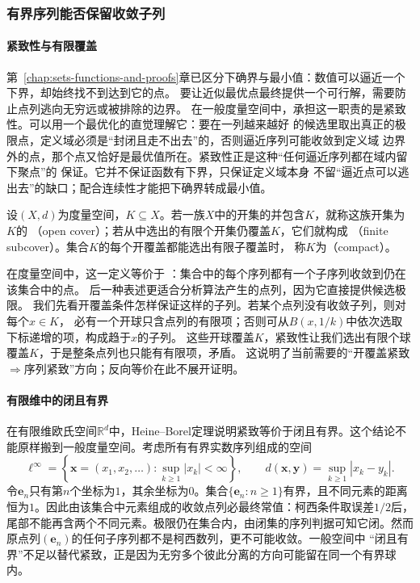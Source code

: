 \subsubsection{有界序列能否保留收敛子列}

\paragraph{紧致性与有限覆盖}

第~\ref{chap:sets-functions-and-proofs}章已区分下确界与最小值：数值可以逼近一个下界，却始终找不到达到它的点。
要让近似最优点最终提供一个可行解，需要防止点列逃向无穷远或被排除的边界。
在一般度量空间中，承担这一职责的是紧致性。可以用一个最优化的直觉理解它：要在一列越来越好
的候选里取出真正的极限点，定义域必须是“封闭且走不出去”的，否则逼近序列可能收敛到定义域
边界外的点，那个点又恰好是最优值所在。紧致性正是这种“任何逼近序列都在域内留下聚点”的
保证。它并不保证函数有下界，只保证定义域本身
不留“逼近点可以逃出去”的缺口；配合连续性才能把下确界转成最小值。
\begin{definition}[开覆盖与紧致性]
\label{def:analysis-compactness}
设$(X,d)$为度量空间，$K\subseteq X$。若一族$X$中的开集的并包含$K$，就称这族开集为$K$的
（open cover）；若从中选出的有限个开集仍覆盖$K$，它们就构成
（finite subcover）。集合$K$的每个开覆盖都能选出有限子覆盖时，
称$K$为（compact）。
\end{definition}
在度量空间中，这一定义等价于
：集合中的每个序列都有一个子序列收敛到仍在该集合中的点。
后一种表述更适合分析算法产生的点列，因为它直接提供候选极限。
我们先看开覆盖条件怎样保证这样的子列。若某个点列没有收敛子列，则对每个$x\in K$，
必有一个开球只含点列的有限项；否则可从$B(x,1/k)$中依次选取下标递增的项，构成趋于$x$的子列。
这些开球覆盖$K$，紧致性让我们选出有限个球覆盖$K$，于是整条点列也只能有有限项，矛盾。
这说明了当前需要的“开覆盖紧致$\Rightarrow$序列紧致”方向；反向等价在此不展开证明。

\paragraph{有限维中的闭且有界}

在有限维欧氏空间$\mathbb{R}^d$中，Heine--Borel定理说明紧致等价于闭且有界。这个结论不能原样搬到一般度量空间。考虑所有有界实数序列组成的空间
\[   \ell^\infty   =   \left\{\bm{x}=(x_1,x_2,\ldots):   \sup_{k\geq1}|x_k|<\infty\right\},   \qquad   d(\bm{x},\bm{y})=\sup_{k\geq1}|x_k-y_k|. \]
令$\bm{e}_n$只有第$n$个坐标为$1$，其余坐标为$0$。集合$\{\bm{e}_n:n\geq1\}$有界，且不同元素的距离恒为$1$。因此由该集合中元素组成的收敛点列必最终常值：柯西条件取误差$1/2$后，尾部不能再含两个不同元素。极限仍在集合内，由闭集的序列判据可知它闭。然而原点列$(\bm e_n)$的任何子序列都不是柯西数列，更不可能收敛。一般空间中 “闭且有界”不足以替代紧致，正是因为无穷多个彼此分离的方向可能留在同一个有界球内。

